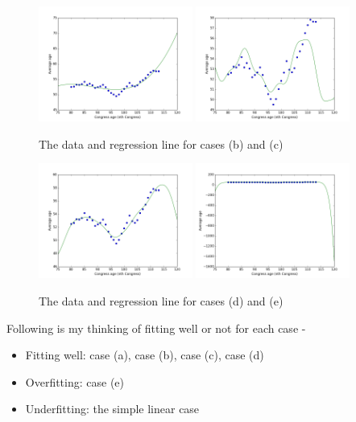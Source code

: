 \documentclass[submit]{harvardml}
\begin{document}
\begin{figure}[h]
\includegraphics[width=0.45\textwidth]{congress-ages-polynomial-3}
\includegraphics[width=0.45\textwidth]{congress-ages-sin-4}
\caption{The data and regression line for cases (b) and (c)}
\end{figure}

\begin{figure}[h]
\includegraphics[width=0.45\textwidth]{congress-ages-sin-7}
\includegraphics[width=0.45\textwidth]{congress-ages-sin-20}
\caption{The data and regression line for cases (d) and (e)}
\end{figure}

Following is my thinking of fitting well or not for each case - 
\begin{itemize}
  \item Fitting well: case (a), case (b), case (c), case (d)
  \item Overfitting: case (e)
  \item Underfitting: the simple linear case
\end{itemize}
\end{document}
